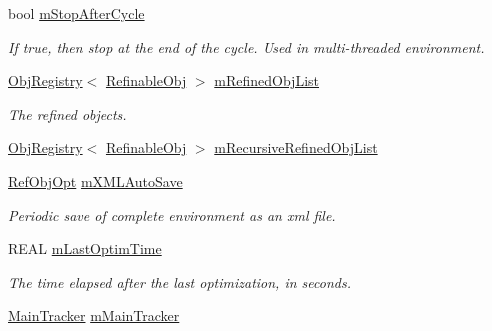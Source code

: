 \begin{DoxyCompactItemize}
\mbox{\label{class_obj_cryst_1_1_optimization_obj_abec493a46c9e57c7e71e886bcae601fb}} 
bool \mbox{\hyperlink{class_obj_cryst_1_1_optimization_obj_abec493a46c9e57c7e71e886bcae601fb}{m\+Stop\+After\+Cycle}}
\begin{DoxyCompactList}\small\item\em If true, then stop at the end of the cycle. Used in multi-\/threaded environment. \end{DoxyCompactList}\item 
\mbox{\label{class_obj_cryst_1_1_optimization_obj_a73f491b5c8a0ae5f087e496916f76016}} 
\mbox{\hyperlink{class_obj_cryst_1_1_obj_registry}{Obj\+Registry}}$<$ \mbox{\hyperlink{class_obj_cryst_1_1_refinable_obj}{Refinable\+Obj}} $>$ \mbox{\hyperlink{class_obj_cryst_1_1_optimization_obj_a73f491b5c8a0ae5f087e496916f76016}{m\+Refined\+Obj\+List}}
\begin{DoxyCompactList}\small\item\em The refined objects. \end{DoxyCompactList}\item 
\mbox{\hyperlink{class_obj_cryst_1_1_obj_registry}{Obj\+Registry}}$<$ \mbox{\hyperlink{class_obj_cryst_1_1_refinable_obj}{Refinable\+Obj}} $>$ \mbox{\hyperlink{class_obj_cryst_1_1_optimization_obj_a0e6a9e9d4d12ed73c582da36190f110f}{m\+Recursive\+Refined\+Obj\+List}}
\item 
\mbox{\label{class_obj_cryst_1_1_optimization_obj_a94038e1c477b1efa6417c13106d6bc89}} 
\mbox{\hyperlink{class_obj_cryst_1_1_ref_obj_opt}{Ref\+Obj\+Opt}} \mbox{\hyperlink{class_obj_cryst_1_1_optimization_obj_a94038e1c477b1efa6417c13106d6bc89}{m\+X\+M\+L\+Auto\+Save}}
\begin{DoxyCompactList}\small\item\em Periodic save of complete environment as an xml file. \end{DoxyCompactList}\item 
\mbox{\label{class_obj_cryst_1_1_optimization_obj_abf309e1b2248a7e1d3744d4b20d15bfd}} 
R\+E\+AL \mbox{\hyperlink{class_obj_cryst_1_1_optimization_obj_abf309e1b2248a7e1d3744d4b20d15bfd}{m\+Last\+Optim\+Time}}
\begin{DoxyCompactList}\small\item\em The time elapsed after the last optimization, in seconds. \end{DoxyCompactList}\item 
\mbox{\hyperlink{class_obj_cryst_1_1_main_tracker}{Main\+Tracker}} \mbox{\hyperlink{class_obj_cryst_1_1_optimization_obj_abe2f9a9812abe0f4a6c414457b5b2967}{m\+Main\+Tracker}}
\end{DoxyCompactItemize}


